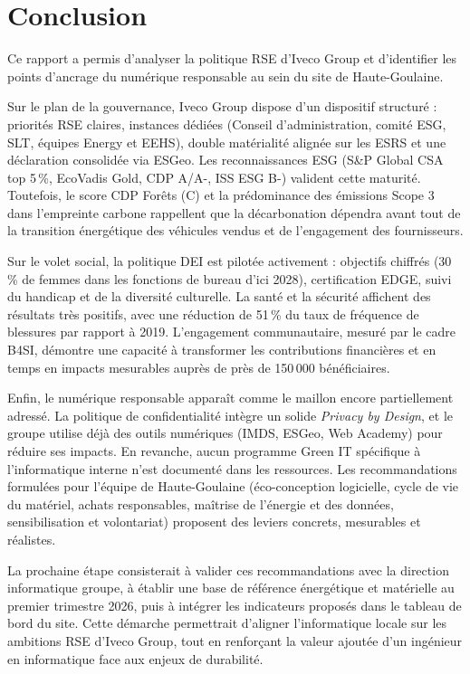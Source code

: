\section*{Conclusion}

Ce rapport a permis d'analyser la politique RSE d'Iveco Group et d'identifier les points d'ancrage du numérique responsable au sein du site de Haute-Goulaine.

Sur le plan de la gouvernance, Iveco Group dispose d'un dispositif structuré : priorités RSE claires, instances dédiées (Conseil d'administration, comité ESG, SLT, équipes Energy et EEHS), double matérialité alignée sur les ESRS et une déclaration consolidée via ESGeo. Les reconnaissances ESG (S\&P Global CSA top 5\,\%, EcoVadis Gold, CDP A/A-, ISS ESG B-) valident cette maturité. Toutefois, le score CDP Forêts (C) et la prédominance des émissions Scope 3 dans l'empreinte carbone rappellent que la décarbonation dépendra avant tout de la transition énergétique des véhicules vendus et de l'engagement des fournisseurs.

Sur le volet social, la politique DEI est pilotée activement : objectifs chiffrés (30\,\% de femmes dans les fonctions de bureau d'ici 2028), certification EDGE, suivi du handicap et de la diversité culturelle. La santé et la sécurité affichent des résultats très positifs, avec une réduction de 51\,\% du taux de fréquence de blessures par rapport à 2019. L'engagement communautaire, mesuré par le cadre B4SI, démontre une capacité à transformer les contributions financières et en temps en impacts mesurables auprès de près de 150\,000 bénéficiaires.

Enfin, le numérique responsable apparaît comme le maillon encore partiellement adressé. La politique de confidentialité intègre un solide \textit{Privacy by Design}, et le groupe utilise déjà des outils numériques (IMDS, ESGeo, Web Academy) pour réduire ses impacts. En revanche, aucun programme Green IT spécifique à l'informatique interne n'est documenté dans les ressources. Les recommandations formulées pour l'équipe de Haute-Goulaine (éco-conception logicielle, cycle de vie du matériel, achats responsables, maîtrise de l'énergie et des données, sensibilisation et volontariat) proposent des leviers concrets, mesurables et réalistes.

La prochaine étape consisterait à valider ces recommandations avec la direction informatique groupe, à établir une base de référence énergétique et matérielle au premier trimestre 2026, puis à intégrer les indicateurs proposés dans le tableau de bord du site. Cette démarche permettrait d'aligner l'informatique locale sur les ambitions RSE d'Iveco Group, tout en renforçant la valeur ajoutée d'un ingénieur en informatique face aux enjeux de durabilité.
